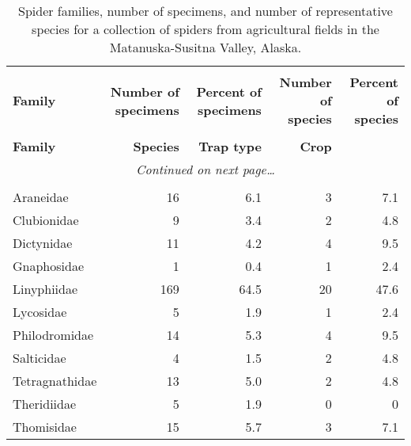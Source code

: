 \begin{longtable}{lrrrr}

\caption{Spider families, number of specimens, and number of representative species for a collection of spiders from agricultural fields in the Matanuska-Susitna Valley, Alaska.\label{spider_families}}\\

\hline
\\[-1.0em]
\hline
\\[-1.0em]
\bf{Family}	&	\bf{Number of specimens}	&	\bf{Percent of specimens}	&	\bf{Number of species}	&	\bf{Percent of species}	\\
\hline
\\[-1.0em]
\endfirsthead

\hline
\bf{Family}	&	\bf{Species}	&	\bf{Trap type}	&	\bf{Crop}	\\
\hline
\endhead

\multicolumn{5}{c}{\textit{Continued on next page\ldots{}}}\\
\hline
\endfoot

\hline
\\[-1.0em]
\hline
\endlastfoot


Araneidae	&	16	&	6.1	&	3	&	7.1	\\
Clubionidae	&	9	&	3.4	&	2	&	4.8	\\
Dictynidae	&	11	&	4.2	&	4	&	9.5	\\
Gnaphosidae	&	1	&	0.4	&	1	&	2.4	\\
Linyphiidae	&	169	&	64.5	&	20	&	47.6	\\
Lycosidae	&	5	&	1.9	&	1	&	2.4	\\
Philodromidae	&	14	&	5.3	&	4	&	9.5	\\
Salticidae	&	4	&	1.5	&	2	&	4.8	\\
Tetragnathidae	&	13	&	5.0	&	2	&	4.8	\\
Theridiidae	&	5	&	1.9	&	0	&	0	\\
Thomisidae	&	15	&	5.7	&	3	&	7.1	\\


\end{longtable}
